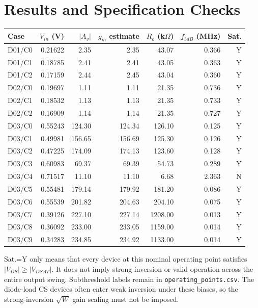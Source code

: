 \section{Results and Specification Checks}
\begin{center}\small\begin{tabular}{lrrrrrr}\toprule
Case & $V_{in}$ (V) & $|A_v|$ & $g_m$ estimate & $R_o$ (k$\Omega$) & $f_{3dB}$ (MHz) & Sat. \\ \midrule
D01/C0 & 0.21622 & 2.35 & 2.35 & 43.07 & 0.366 & Y \\
D01/C1 & 0.18785 & 2.41 & 2.41 & 43.05 & 0.363 & Y \\
D01/C2 & 0.17159 & 2.44 & 2.45 & 43.04 & 0.360 & Y \\
D02/C0 & 0.19697 & 1.11 & 1.11 & 21.35 & 0.736 & Y \\
D02/C1 & 0.18532 & 1.13 & 1.13 & 21.35 & 0.733 & Y \\
D02/C2 & 0.16909 & 1.14 & 1.14 & 21.35 & 0.727 & Y \\
D03/C0 & 0.55243 & 124.30 & 124.34 & 126.10 & 0.125 & Y \\
D03/C1 & 0.49981 & 156.65 & 156.69 & 125.30 & 0.126 & Y \\
D03/C2 & 0.47225 & 174.09 & 174.13 & 123.60 & 0.128 & Y \\
D03/C3 & 0.60983 & 69.37 & 69.39 & 54.73 & 0.289 & Y \\
D03/C4 & 0.71517 & 11.10 & 11.10 & 6.68 & 2.363 & N \\
D03/C5 & 0.55481 & 179.14 & 179.92 & 181.20 & 0.086 & Y \\
D03/C6 & 0.55539 & 201.82 & 204.63 & 204.10 & 0.075 & Y \\
D03/C7 & 0.39126 & 227.10 & 227.14 & 1208.00 & 0.013 & Y \\
D03/C8 & 0.36092 & 233.00 & 233.05 & 1159.00 & 0.014 & Y \\
D03/C9 & 0.34283 & 234.85 & 234.92 & 1133.00 & 0.014 & Y \\
\bottomrule\end{tabular}\end{center}
Sat.=Y only means that every device at this nominal operating point satisfies $|V_{DS}|\ge|V_{DSAT}|$. It does not imply strong inversion or valid operation across the entire output swing. Subthreshold labels remain in \texttt{operating\_points.csv}. The diode-load CS devices often enter weak inversion under these biases, so the strong-inversion $\sqrt W$ gain scaling must not be imposed.

